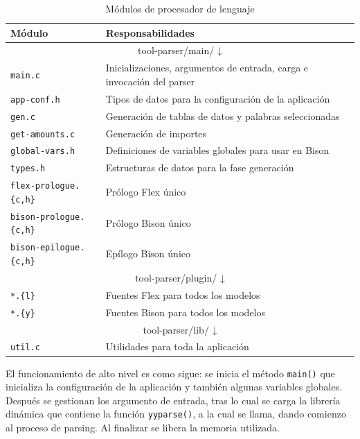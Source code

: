 \begin{table}[ht]
    \centering
    \begin{tabular}{l l}
        Módulo & Responsabilidades \\
        \hline
        \hline
        \multicolumn{2}{c}{tool-parser/main/ ↓} \\
        \hline    
        \verb|main.c| & Inicializaciones, argumentos de entrada, carga e invocación del parser \\
        \verb|app-conf.h| & Tipos de datos para la configuración de la aplicación \\
        \verb|gen.c| & Generación de tablas de datos y palabras seleccionadas \\
        \verb|get-amounts.c| & Generación de importes \\
        \verb|global-vars.h| & Definiciones de variables globales para usar en Bison \\
        \verb|types.h| & Estructuras de datos para la fase generación \\
        \verb|flex-prologue.{c,h}| & Prólogo Flex único \\
        \verb|bison-prologue.{c,h}| & Prólogo Bison único \\
        \verb|bison-epilogue.{c,h}| & Epílogo Bison único \\
        \hline
        \multicolumn{2}{c}{tool-parser/plugin/ ↓} \\            
        \hline        
        \verb|*.{l}| & Fuentes Flex para todos los modelos \\
        \verb|*.{y}| & Fuentes Bison para todos los modelos \\
        \hline
        \multicolumn{2}{c}{tool-parser/lib/ ↓} \\     
        \hline
        \verb|util.c| & Utilidades para toda la aplicación \\
    \end{tabular}
    \caption{Módulos de procesador de lenguaje}    
    \label{tab:modulos-procesador-lenguaje}
\end{table}

El funcionamiento de alto nivel es como sigue: se inicia el método \verb|main()| que inicializa la configuración de la aplicación y también algunas variables globales. Después se gestionan los argumento de entrada, tras lo cual se carga la librería dinámica que contiene la función \verb|yyparse()|, a la cual se llama, dando comienzo al proceso de parsing. Al finalizar se libera la memoria utilizada.

